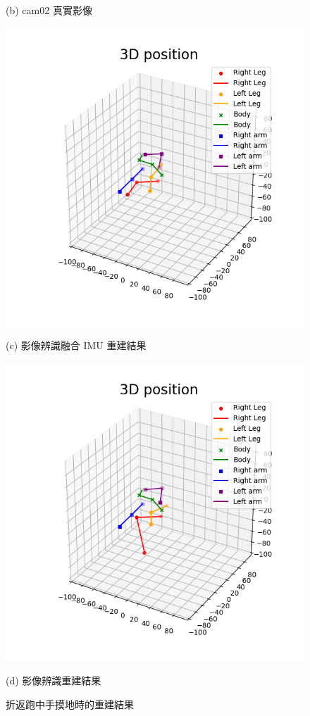 \begin{figure}[!ht]
\begin{minipage}{.5\textwidth}
       \caption*{(b) cam02 真實影像}
    \end{minipage}
    \begin{minipage}{.5\textwidth}
       \centering
       \includegraphics[width=.95\linewidth]{figure/ch4_fig_run_result_with3.png}
       \caption*{(c) 影像辨識融合 IMU 重建結果}
    \end{minipage}%
    \begin{minipage}{.5\textwidth}
       \centering
       \includegraphics[width=.95\linewidth]{figure/ch4_fig_run_result_no3.png}
       \caption*{(d) 影像辨識重建結果}
    \end{minipage}
   \caption[折返跑中手摸地時的重建結果]{折返跑中手摸地時的重建結果}
   \label{ch4_fig_run_touch}
\end{figure}

